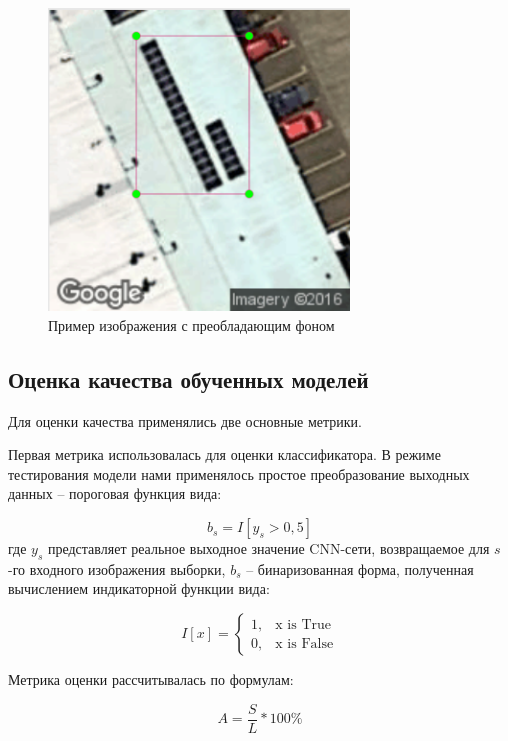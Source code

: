 \begin{figure}[ht]
	\centering
	\includegraphics[width=8cm]{man-source/images/ch4/pic4-18.png}
	\caption{Пример изображения с преобладающим фоном}
	\label{fig:background_dominate}
\end{figure}

\subsection{Оценка качества обученных моделей}

Для оценки качества применялись две основные метрики. 

Первая метрика использовалась для оценки классификатора. В режиме тестирования модели нами применялось простое преобразование выходных данных -- пороговая функция вида:

\begin{equation*}
    b_s = I[y_s > 0,5]
\end{equation*}
где $y_s$ представляет реальное выходное значение CNN-сети, возвращаемое для $s$-го входного изображения выборки, $b_s$ -- бинаризованная форма, полученная вычислением индикаторной функции вида:

\begin{equation*}
    I[x] = 
    \begin{cases}
        1, & \text{x is True} \\
        0, & \text{x is False}
    \end{cases}
\end{equation*}

Метрика оценки рассчитывалась по формулам:

\begin{equation*}
    A = \frac{S}{L} * 100\%
\end{equation*}

